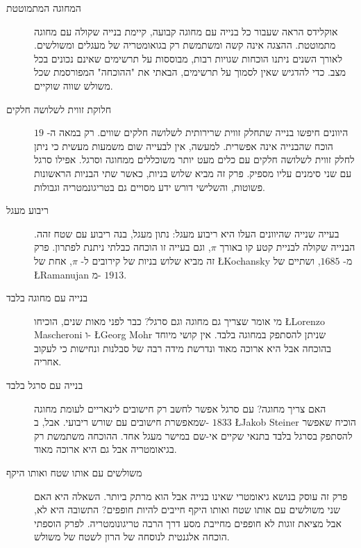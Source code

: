 \begin{description}
\item[המחוגה המתמוטטת]
אוקלידס הראה שעבור כל בנייה עם מחוגה קבועה, קיימת בנייה שקולה עם מחוגה מתמוטטת. ההצגה אינה קשה ומשתמשת רק בגואומטריה של מעגלים ומשולשים. לאורך השנים ניתנו הוכחות שגויות רבות, מבוססות על תרשימים שאינם נכונים בכל מצב. כדי להדגיש שאין לסמוך על תרשימים, הבאתי את "ההוכחה" המפורסמת שכל משולש שווה שוקיים.
\item[חלוקת זווית לשלושה חלקים]
היוונים חיפשו בנייה שתחלק זווית שרירותית לשלושה חלקים שווים. רק במאה ה-%
$19$
הוכח שהבנייה אינה אפשרית. למעשה, אין לבעייה שום משמעות מעשית כי ניתן לחלק זווית לשלושה חלקים עם כלים מעט יותר משוכללים ממחוגה וסרגל. אפילו סרגל עם שני סימנים עליו מספיק. פרק זה מביא שלוש בניות, כאשר שתי הבניות הראשונות פשוטות, והשלישי דורש ידע מסויים גם בטריגונמטריה וגבולות.

\item[ריבוע מעגל]
בעייה שנייה שהיוונים העלו היא ריבוע מעגל: נתון מעגל, בנה ריבוע עם שטח זהה. הבנייה שקולה לבניית קטע קו באורך 
$\pi$,
וגם בעייה זו הוכחה כבלתי ניתנת לפתרון. פרק זה מביא שלוש בניות של קירובים ל-%
$\pi$,
אחת של
\L{Kochansky}
מ-%
$1685$,
ושתיים של
\L{Ramanujan}
מ-%
$1913$.

\item[בנייה עם מחוגה בלבד]
מי אומר שצריך גם מחוגה וגם סרגל? כבר לפני מאות שנים, הוכיחו
\L{Lorenzo Mascheroni}
ו-%
\L{Georg Mohr}
שניתן להסתפק במחוגה בלבד. אין קושי מיוחד בהוכחה אבל היא ארוכה מאוד ונדרשת מידה רבה של סבלנות ונחישות כי לעקוב אחריה.

\item[בנייה עם סרגל בלבד]
האם צריך מחוגה? עם סרגל אפשר לחשב רק חישובים לינאריים לעומת מחוגה שמאפשרת חישובים עם שורש ריבועי. אבל, ב-%
$1833$
\L{Jakob Steiner}
הוכיח שאפשר להסתפק בסרגל בלבד בתנאי שקיים אי-שם במישר מעגל אחד. ההוכחה משתמשת רק בגיאומטריה אבל גם היא ארוכה מאוד.

\item[משולשים עם אותו שטח ואותו היקף]
פרק זה עוסק בנושא גיאומטרי שאינו בנייה אבל הוא מרתק ביותר. השאלה היא האם שני משולשים עם אותו שטח ואותו היקף חייבים להיות חופפים? התשובה היא לא, אבל מציאת זוגות לא חופפים מחייבת מסע דרך הרבה טריגונומטריה. לפרק הוספתי הוכחה אלגנטית לנוסחה של הרון לשטח של משולש.

\end{description}

